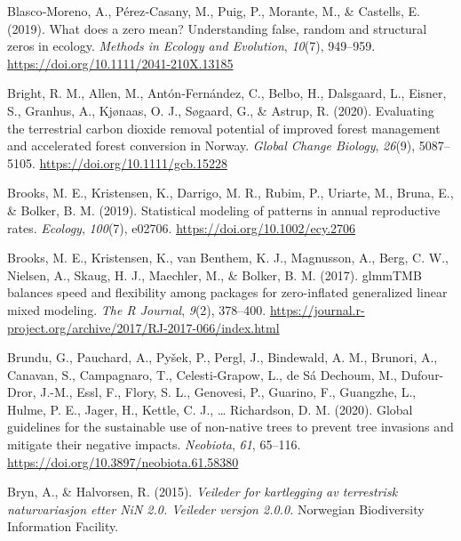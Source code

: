 \documentclass[
]{article}
\newlength{\cslhangindent}
\newenvironment{CSLReferences}[2] %
 {\begin{list}{}{%
  \setlength{\itemindent}{0pt}
  \setlength{\leftmargin}{0pt}
  \setlength{\parsep}{0pt}
  \ifodd #1
   \setlength{\leftmargin}{\cslhangindent}
   \setlength{\itemindent}{-1\cslhangindent}
  \fi
  \setlength{\itemsep}{#2\baselineskip}}}
 {\end{list}}
\begin{document}
\begin{CSLReferences}{1}{0}
Blasco‐Moreno, A., Pérez‐Casany, M., Puig, P., Morante, M., \& Castells, E. (2019). What does a zero mean? Understanding false, random and structural zeros in ecology. \emph{Methods in Ecology and Evolution}, \emph{10}(7), 949--959. \url{https://doi.org/10.1111/2041-210X.13185}

Bright, R. M., Allen, M., Antón‐Fernández, C., Belbo, H., Dalsgaard, L., Eisner, S., Granhus, A., Kjønaas, O. J., Søgaard, G., \& Astrup, R. (2020). Evaluating the terrestrial carbon dioxide removal potential of improved forest management and accelerated forest conversion in {Norway}. \emph{Global Change Biology}, \emph{26}(9), 5087--5105. \url{https://doi.org/10.1111/gcb.15228}

Brooks, M. E., Kristensen, K., Darrigo, M. R., Rubim, P., Uriarte, M., Bruna, E., \& Bolker, B. M. (2019). Statistical modeling of patterns in annual reproductive rates. \emph{Ecology}, \emph{100}(7), e02706. \url{https://doi.org/10.1002/ecy.2706}

Brooks, M. E., Kristensen, K., van Benthem, K. J., Magnusson, A., Berg, C. W., Nielsen, A., Skaug, H. J., Maechler, M., \& Bolker, B. M. (2017). {glmmTMB} balances speed and flexibility among packages for zero-inflated generalized linear mixed modeling. \emph{The R Journal}, \emph{9}(2), 378--400. \url{https://journal.r-project.org/archive/2017/RJ-2017-066/index.html}

Brundu, G., Pauchard, A., Pyšek, P., Pergl, J., Bindewald, A. M., Brunori, A., Canavan, S., Campagnaro, T., Celesti-Grapow, L., de Sá Dechoum, M., Dufour-Dror, J.-M., Essl, F., Flory, S. L., Genovesi, P., Guarino, F., Guangzhe, L., Hulme, P. E., Jager, H., Kettle, C. J., \ldots{} Richardson, D. M. (2020). Global guidelines for the sustainable use of non-native trees to prevent tree invasions and mitigate their negative impacts. \emph{Neobiota}, \emph{61}, 65--116. \url{https://doi.org/10.3897/neobiota.61.58380}

Bryn, A., \& Halvorsen, R. (2015). \emph{Veileder for kartlegging av terrestrisk naturvariasjon etter {NiN} 2.0. Veileder versjon 2.0.0.} {Norwegian Biodiversity Information Facility}.


\end{CSLReferences}
\end{document}

